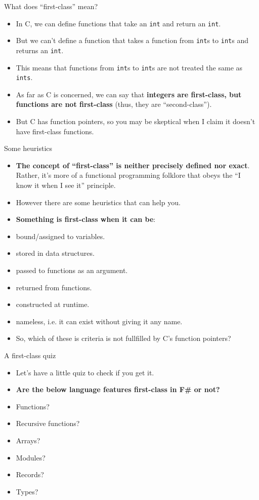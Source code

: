\documentclass{beamer}
\newcommand{\m}[1]{\texttt{#1}}
\begin{document}
\begin{frame}{What does ``first-class'' mean?}
\begin{itemize}
	\item In C, we can define functions that take an \m{int} and return an \m{int}.
	\item But we can't define a function that takes a function from \m{int}s to \m{int}s and returns an \m{int}.
	\item This means that functions from \m{int}s to \m{int}s are not treated the same as \m{ints}.
	\item As far as C is concerned, we can say that \textbf{integers are first-class, but functions are not first-class} (thus, they are ``second-class'').
	\item But C has function pointers, so you may be skeptical when I claim it doesn't have first-class functions.
\end{itemize}
\end{frame}
	
\begin{frame}{Some heuristics}
\begin{itemize}
	\item \textbf{The concept of ``first-class'' is neither precisely defined nor exact}. Rather, it's more of a functional programming folklore that obeys the ``I know it when I see it'' principle.
	\item However there are some heuristics that can help you.
	\item \textbf{Something is first-class when it can be}:
	\item bound/assigned to variables.
	\item stored in data structures.
	\item passed to functions as an argument.
	\item returned from functions.
	\item constructed at runtime.
	\item nameless, i.e. it can exist without giving it any name.
	\item So, which of these is criteria is not fullfilled by C's function pointers?
\end{itemize}
\end{frame}

\begin{frame}{A first-class quiz}
\begin{itemize}
	\item Let's have a little quiz to check if you get it.
	\item \textbf{Are the below language features first-class in F\# or not?}
	\item Functions?
	\item Recursive functions?
	\item Arrays?
	\item Modules?
	\item Records?
	\item Types?
\end{itemize}
\end{frame}
\end{document}
